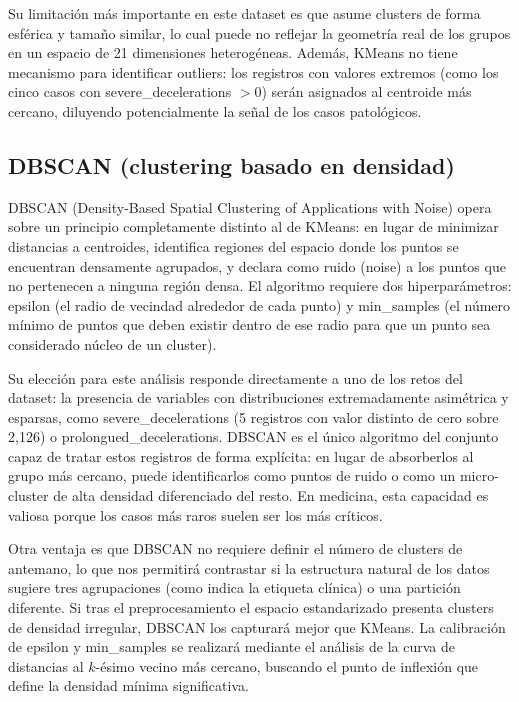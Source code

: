 \documentclass[12pt,letterpaper]{article}
\begin{document}
Su limitación más importante en este dataset es que asume clusters de forma esférica y tamaño
similar, lo cual puede no reflejar la geometría real de los grupos en un espacio de 21 dimensiones
heterogéneas. Además, K\-Means no tiene mecanismo para identificar outliers: los registros con
valores extremos (como los cinco casos con severe\_decelerations $> 0$) serán asignados al
centroide más cercano, diluyendo potencialmente la señal de los casos patológicos.

\subsection{DBSCAN (clustering basado en densidad)}

DBSCAN (Density-Based Spatial Clustering of Applications with Noise) opera sobre un principio
completamente distinto al de K\-Means: en lugar de minimizar distancias a centroides, identifica
regiones del espacio donde los puntos se encuentran densamente agrupados, y declara como ruido
(noise) a los puntos que no pertenecen a ninguna región densa. El algoritmo requiere dos
hiperparámetros: epsilon (el radio de vecindad alrededor de cada punto) y min\_samples (el número
mínimo de puntos que deben existir dentro de ese radio para que un punto sea considerado núcleo de
un cluster).

Su elección para este análisis responde directamente a uno de los retos del dataset: la presencia
de variables con distribuciones extremadamente asimétrica y esparsas, como severe\_decelerations
(5 registros con valor distinto de cero sobre 2,126) o prolongued\_decelerations. DBSCAN es el
único algoritmo del conjunto capaz de tratar estos registros de forma explícita: en lugar de
absorberlos al grupo más cercano, puede identificarlos como puntos de ruido o como un micro-cluster
de alta densidad diferenciado del resto. En medicina, esta capacidad es valiosa porque los casos
más raros suelen ser los más críticos.

Otra ventaja es que DBSCAN no requiere definir el número de clusters de antemano, lo que nos
permitirá contrastar si la estructura natural de los datos sugiere tres agrupaciones (como indica
la etiqueta clínica) o una partición diferente. Si tras el preprocesamiento el espacio estandarizado
presenta clusters de densidad irregular, DBSCAN los capturará mejor que K\-Means. La calibración de
epsilon y min\_samples se realizará mediante el análisis de la curva de distancias al $k$-ésimo
vecino más cercano, buscando el punto de inflexión que define la densidad mínima significativa.
\end{document}
